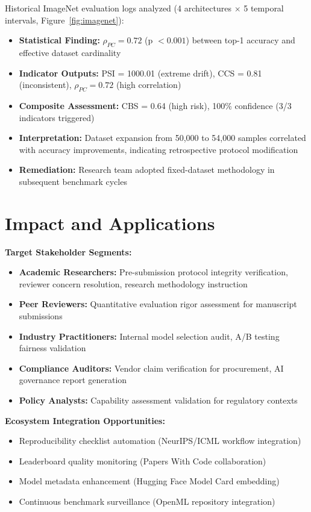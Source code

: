 \documentclass[10pt]{article}
\begin{document}
Historical ImageNet evaluation logs analyzed (4 architectures $\times$ 5 temporal intervals, Figure~\ref{fig:imagenet}):
\begin{itemize}
    \item \textbf{Statistical Finding:} $\rho_{PC} = 0.72$ (p $< 0.001$) between top-1 accuracy and effective dataset cardinality
    \item \textbf{Indicator Outputs:} PSI = 1000.01 (extreme drift), CCS = 0.81 (inconsistent), $\rho_{PC} = 0.72$ (high correlation)
    \item \textbf{Composite Assessment:} CBS = 0.64 (high risk), 100\% confidence (3/3 indicators triggered)
    \item \textbf{Interpretation:} Dataset expansion from 50,000 to 54,000 samples correlated with accuracy improvements, indicating retrospective protocol modification
    \item \textbf{Remediation:} Research team adopted fixed-dataset methodology in subsequent benchmark cycles
\end{itemize}

\section{Impact and Applications}

\textbf{Target Stakeholder Segments:}
\begin{itemize}
    \item \textbf{Academic Researchers:} Pre-submission protocol integrity verification, reviewer concern resolution, research methodology instruction
    \item \textbf{Peer Reviewers:} Quantitative evaluation rigor assessment for manuscript submissions
    \item \textbf{Industry Practitioners:} Internal model selection audit, A/B testing fairness validation
    \item \textbf{Compliance Auditors:} Vendor claim verification for procurement, AI governance report generation
    \item \textbf{Policy Analysts:} Capability assessment validation for regulatory contexts
\end{itemize}

\textbf{Ecosystem Integration Opportunities:}
\begin{itemize}
    \item Reproducibility checklist automation (NeurIPS/ICML workflow integration)
    \item Leaderboard quality monitoring (Papers With Code collaboration)
    \item Model metadata enhancement (Hugging Face Model Card embedding)
    \item Continuous benchmark surveillance (OpenML repository integration)
\end{itemize}
\end{document}
